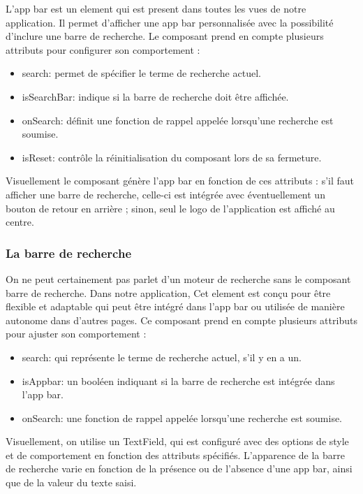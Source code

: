 L'app bar est un element qui est present dans toutes les vues de notre
application. Il permet d'afficher une app bar personnalisée avec la
possibilité d'inclure une barre de recherche. Le composant prend en
compte plusieurs attributs pour configurer son comportement :

\begin{itemize}
\tightlist
\item
  search: permet de spécifier le terme de recherche actuel.
\item
  isSearchBar: indique si la barre de recherche doit être affichée.
\item
  onSearch: définit une fonction de rappel appelée lorsqu'une recherche
  est soumise.
\item
  isReset: contrôle la réinitialisation du composant lors de sa
  fermeture.
\end{itemize}

Visuellement le composant génère l'app bar en fonction de ces attributs
: s'il faut afficher une barre de recherche, celle-ci est intégrée avec
éventuellement un bouton de retour en arrière ; sinon, seul le logo de
l'application est affiché au centre.

\subsubsection{La barre de recherche}\label{la-barre-de-recherche}

On ne peut certainement pas parlet d'un moteur de recherche sans le
composant barre de recherche. Dans notre application, Cet element est
conçu pour être flexible et adaptable qui peut être intégré dans l'app
bar ou utilisée de manière autonome dans d'autres pages. Ce composant
prend en compte plusieurs attributs pour ajuster son comportement :

\begin{itemize}
\tightlist
\item
  search: qui représente le terme de recherche actuel, s'il y en a un.
\item
  isAppbar: un booléen indiquant si la barre de recherche est intégrée
  dans l'app bar.
\item
  onSearch: une fonction de rappel appelée lorsqu'une recherche est
  soumise.
\end{itemize}

Visuellement, on utilise un TextField, qui est configuré avec des
options de style et de comportement en fonction des attributs spécifiés.
L'apparence de la barre de recherche varie en fonction de la présence ou
de l'absence d'une app bar, ainsi que de la valeur du texte saisi.

